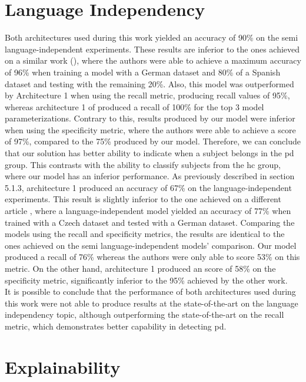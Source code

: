 \section{Language Independency}

Both architectures used during this work yielded an accuracy of 90\% on the semi language-independent experiments. These results are inferior to the ones achieved on a similar work (\cite{parkinson_three_languages}), where the authors were able to achieve a maximum accuracy of 96\% when training a model with a German dataset and 80\% of a Spanish dataset and testing with the remaining 20\%. Also, this model was outperformed by Architecture 1 when using the recall metric, producing recall values  of 95\%, whereas architecture 1 of produced a recall of 100\% for the top 3 model parameterizations. Contrary to this, results produced by our model were inferior when using the specificity metric, where the authors were able to achieve a score of 97\%, compared to the 75\% produced by our model. Therefore, we can conclude that our solution has better ability to indicate when a subject belongs in the \gls{pd} group. This contrasts with the ability to classify subjects from the \gls{hc} group, where our model has an inferior performance. As previously described in section 5.1.3, architecture 1 produced an accuracy of 67\% on the language-independent experiments. This result is slightly inferior to the one achieved on a different article \cite{parkinson_three_languages}, where a language-independent model yielded an accuracy of 77\% when trained with a Czech dataset and tested with a German dataset. Comparing the models using the recall and specificity metrics, the results are identical to the ones achieved on the semi language-independent models' comparison. Our model produced a recall of 76\% whereas the authors were only able to score 53\% on this metric. On the other hand, architecture 1 produced an score of 58\% on the specificity metric, significantly inferior to the 95\% achieved by the other work. \\
It is possible to conclude that the performance of both architectures used during this work were not able to produce results at the state-of-the-art on the language independency topic, although outperforming the state-of-the-art on the recall metric, which demonstrates better capability in detecting \gls{pd}.

\section{Explainability}

